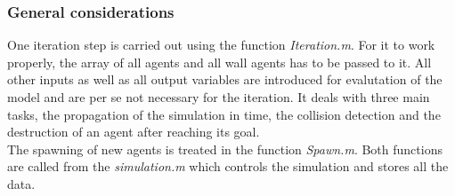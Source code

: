 \subsubsection{General considerations}
One iteration step is carried out using the function \textit{Iteration.m}. For it to work properly, the array of all agents and all wall agents has to be passed to it. All other inputs as well as all output variables are introduced for evalutation of the model and are per se not necessary for the iteration. It deals with three main tasks, the propagation of the simulation in time, the collision detection and the destruction of an agent after reaching its goal.\\
The spawning of new agents is treated in the function \textit{Spawn.m}. Both functions are called from the \textit{simulation.m} which controls the simulation and stores all the data.

